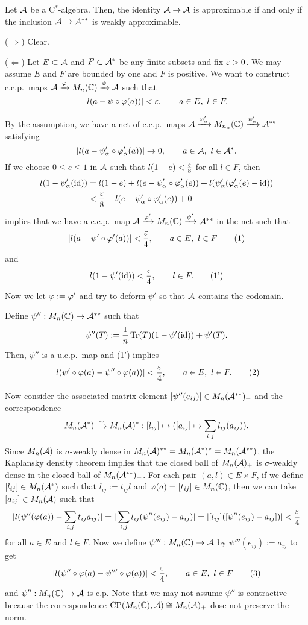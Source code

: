 \documentclass{../../../small}
\begin{document}
\begin{thm}
Let $\mathcal{A}$ be a C$^*$-algebra.
Then, the identity $\mathcal{A}\to\mathcal{A}$ is approximable if and only if the inclusion $\mathcal{A}\to\mathcal{A}^{**}$ is weakly approximable.
\end{thm}
\begin{pf}
($\Rightarrow$)
Clear.

($\Leftarrow$)
Let $E\subset\mathcal{A}$ and $F\subset\mathcal{A}^*$ be any finite subsets and fix $\varepsilon>0$.
We may assume $E$ and $F$ are bounded by one and $F$ is positive.
We want to construct c.c.p.~maps $\mathcal{A}\xrightarrow{\varphi}M_n(\mathbb{C})\xrightarrow{\psi}\mathcal{A}$ such that
\[|l(a-\psi\circ\varphi(a))|<\varepsilon,\qquad a\in E,\ l\in F.\]

By the assumption, we have a net of c.c.p.~maps $\mathcal{A}\xrightarrow{\varphi'_\alpha}M_{n_\alpha}(\mathbb{C})\xrightarrow{\psi'_\alpha}\mathcal{A}^{**}$ satisfying
\[|l(a-\psi'_\alpha\circ\varphi'_\alpha(a))|\to0,\qquad a\in\mathcal{A},\ l\in\mathcal{A}^*.\]
If we choose $0\le e\le1$ in $\mathcal{A}$ such that $l(1-e)<\frac{\varepsilon}8$ for all $l\in F$, then
\begin{align*}
l(1-\psi'_\alpha(\operatorname{id}))
&=l(1-e)+l(e-\psi'_\alpha\circ\varphi'_\alpha(e))+l(\psi'_\alpha(\varphi'_\alpha(e)-\operatorname{id}))\\
&<\frac{\varepsilon}8+l(e-\psi'_\alpha\circ\varphi'_\alpha(e))+0
\end{align*}
implies that we have a c.c.p.~map $\mathcal{A}\xrightarrow{\varphi'}M_n(\mathbb{C})\xrightarrow{\psi'}\mathcal{A}^{**}$ in the net such that
\[|l(a-\psi'\circ\varphi'(a))|<\frac{\varepsilon}4,\qquad a\in E,\ l\in F\tag{1}\]
and
\[l(1-\psi'(\operatorname{id}))<\frac{\varepsilon}4,\qquad l\in F.\tag{1'}\]
Now we let $\varphi:=\varphi'$ and try to deform $\psi'$ so that $\mathcal{A}$ contains the codomain.

Define $\psi'':M_n(\mathbb{C})\to\mathcal{A}^{**}$ such that
\[\psi''(T):=\frac1n\operatorname{Tr}(T)(1-\psi'(\operatorname{id}))+\psi'(T).\]
Then, $\psi''$ is a u.c.p.~map and (1') implies
\[|l(\psi'\circ\varphi(a)-\psi''\circ\varphi(a))|<\frac{\varepsilon}4,\qquad a\in E,\ l\in F.\tag{2}\]

Now consider the associated matrix element $[\psi''(e_{ij})]\in M_n(\mathcal{A}^{**})_+$ and the correspondence
\[M_n(\mathcal{A}^*)\xrightarrow{\sim}M_n(\mathcal{A})^*:[l_{ij}]\mapsto([a_{ij}]\mapsto\sum_{i,j}l_{ij}(a_{ij})).\]
Since $M_n(\mathcal{A})$ is $\sigma$-weakly dense in $M_n(\mathcal{A})^{**}=M_n(\mathcal{A}^*)^*=M_n(\mathcal{A}^{**})$, the Kaplansky density theorem implies that the closed ball of $M_n(\mathcal{A})_+$ is $\sigma$-weakly dense in the closed ball of $M_n(\mathcal{A}^{**})_+$.
For each pair $(a,l)\in E\times F$, if we define $[l_{ij}]\in M_n(\mathcal{A}^*)$ such that $l_{ij}:=t_{ij}l$ and $\varphi(a)=[t_{ij}]\in M_n(\mathbb{C})$, then we can take $[a_{ij}]\in M_n(\mathcal{A})$ such that
\[|l(\psi''(\varphi(a))-\sum_{i,j}t_{ij}a_{ij})|=|\sum_{i,j}l_{ij}(\psi''(e_{ij})-a_{ij})|=|[l_{ij}]([\psi''(e_{ij})-a_{ij}])|<\frac{\varepsilon}4\]
for all $a\in E$ and $l\in F$.
Now we define $\psi''':M_n(\mathbb{C})\to\mathcal{A}$ by $\psi'''(e_{ij}):=a_{ij}$ to get
\[|l(\psi''\circ\varphi(a)-\psi'''\circ\varphi(a))|<\frac{\varepsilon}4,\qquad a\in E,\ l\in F\tag{3}\]
and $\psi'':M_n(\mathbb{C})\to\mathcal{A}$ is c.p.
Note that we may not assume $\psi''$ is contractive because the correspondence $\mathrm{CP}(M_n(\mathbb{C}),\mathcal{A})\cong M_n(\mathcal{A})_+$ dose not preserve the norm.


\end{pf}
\end{document}
